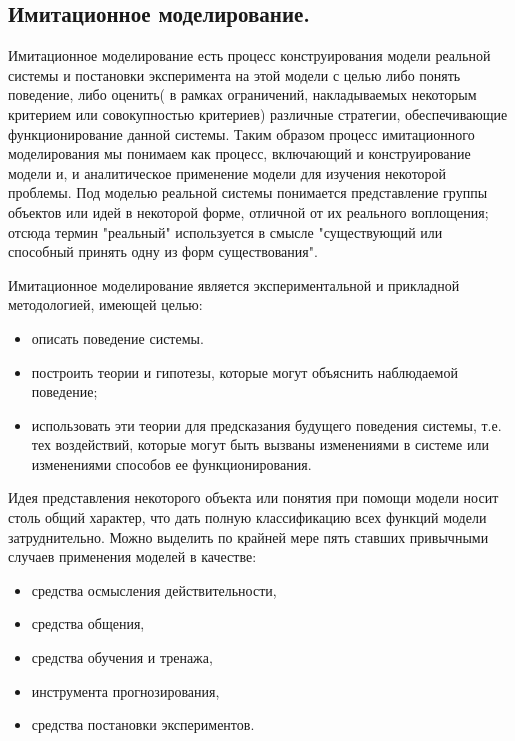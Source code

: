 \subsection{Имитационное моделирование.}

    Имитационное моделирование есть процесс конструирования модели реальной системы и постановки эксперимента на этой модели с целью либо понять поведение, либо оценить( в рамках ограничений, накладываемых некоторым критерием или совокупностью критериев) различные стратегии, обеспечивающие функционирование данной системы. Таким образом процесс имитационного моделирования мы понимаем как процесс, включающий и конструирование модели и, и аналитическое применение модели для изучения некоторой проблемы. Под моделью реальной системы понимается представление группы объектов или идей в некоторой форме, отличной от их реального воплощения; отсюда термин "реальный" используется в смысле "существующий или способный принять одну из форм существования".

    Имитационное моделирование является экспериментальной и прикладной методологией, имеющей целью:

\begin{itemize}
    \item описать поведение системы.
    \item построить теории и гипотезы, которые могут объяснить наблюдаемой поведение;
    \item использовать эти теории для предсказания будущего поведения системы, т.е. тех воздействий, которые могут быть вызваны изменениями в системе или изменениями способов ее функционирования.
\end{itemize}

  Идея представления некоторого объекта или понятия при помощи модели носит столь общий характер, что дать полную классификацию всех функций модели затруднительно. Можно выделить по крайней мере пять ставших привычными случаев применения моделей в качестве:

\begin{itemize}
    \item средства осмысления действительности,
    \item средства общения,
    \item средства обучения и тренажа,
    \item инструмента прогнозирования,
    \item средства постановки экспериментов.
\end{itemize}

